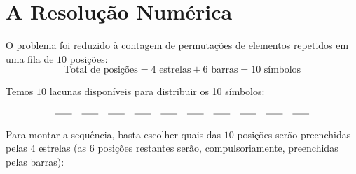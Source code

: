 \documentclass[12pt,a4paper]{report}
\begin{document}
	\section{A Resolução Numérica}
	
	O problema foi reduzido à contagem de permutações de elementos repetidos em uma fila de $10$ posições:
	$$\text{Total de posições} = 4 \text{ estrelas} + 6 \text{ barras} = 10 \text{ símbolos}$$
	
	Temos $10$ lacunas disponíveis para distribuir os 10 símbolos:
	$$\underline{\hspace{0.6cm}} \quad \underline{\hspace{0.6cm}} \quad \underline{\hspace{0.6cm}} \quad \underline{\hspace{0.6cm}} \quad \underline{\hspace{0.6cm}} \quad \underline{\hspace{0.6cm}} \quad \underline{\hspace{0.6cm}} \quad \underline{\hspace{0.6cm}} \quad \underline{\hspace{0.6cm}} \quad \underline{\hspace{0.6cm}}$$
	
	Para montar a sequência, basta escolher quais das $10$ posições serão preenchidas pelas $4$ estrelas (as $6$ posições restantes serão, compulsoriamente, preenchidas pelas barras):
	 
\end{document}
